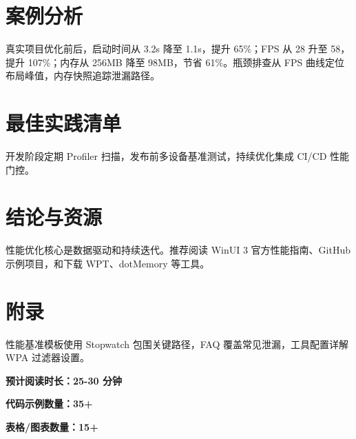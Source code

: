 \chapter{案例分析}
真实项目优化前后，启动时间从 3.2s 降至 1.1s，提升 65\%{}；FPS 从 28 升至 58，提升 107\%{}；内存从 256MB 降至 98MB，节省 61\%{}。瓶颈排查从 FPS 曲线定位布局峰值，内存快照追踪泄漏路径。\par
\chapter{最佳实践清单}
开发阶段定期 Profiler 扫描，发布前多设备基准测试，持续优化集成 CI/CD 性能门控。\par
\chapter{结论与资源}
性能优化核心是数据驱动和持续迭代。推荐阅读 WinUI 3 官方性能指南、GitHub 示例项目，和下载 WPT、dotMemory 等工具。\par
\chapter{附录}
性能基准模板使用 Stopwatch 包围关键路径，FAQ 覆盖常见泄漏，工具配置详解 WPA 过滤器设置。\par
\textbf{预计阅读时长：25-30 分钟}\par
\textbf{代码示例数量：35+}\par
\textbf{表格/图表数量：15+}\par
